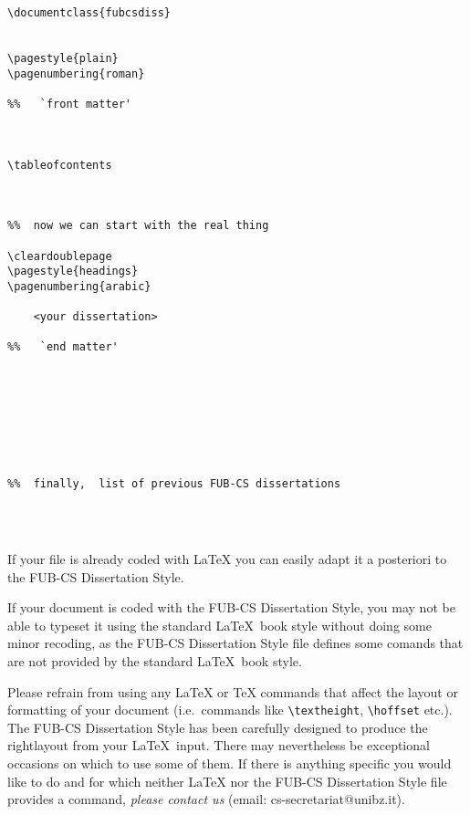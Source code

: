 \begin{verbatim}
\documentclass{fubcsdiss}


\pagestyle{plain}
\pagenumbering{roman}

%%   `front matter'



\tableofcontents



%%  now we can start with the real thing

\cleardoublepage
\pagestyle{headings}
\pagenumbering{arabic}
  
    <your dissertation>

%%   `end matter'








%%  finally,  list of previous FUB-CS dissertations




\end{verbatim}
%
%
If your file is already coded with \LaTeX{} you can easily
adapt it a posteriori to the FUB-CS Dissertation Style.

If your document is coded with the FUB-CS Dissertation Style,
you may not be able to typeset it using the standard \LaTeX\ book style
without doing some minor recoding,
as the FUB-CS Dissertation Style file defines some comands 
that are not provided by the standard \LaTeX\ book style.

Please refrain from using any \LaTeX{} or \TeX{} commands
that affect the layout or formatting of your document
(i.e.\ commands like \verb|\textheight|, \verb|\hoffset| etc.).
The FUB-CS Dissertation Style has been carefully designed 
to produce the rightlayout from your \LaTeX\ input.
There may nevertheless be exceptional occasions on which to use some of them.
If there is anything specific you would like to do 
and for which neither \LaTeX{} nor the FUB-CS Dissertation Style file 
provides a command,
{\em please contact us\/} (email: cs-secretariat@unibz.it).

